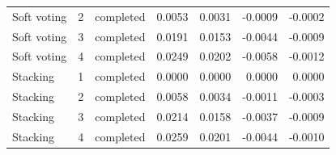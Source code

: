 \begin{table}[htbp]
\begin{tabular}{lrrrrrr}
Soft voting & 2 & completed & 0.0053 & 0.0031 & -0.0009 & -0.0002 \\
Soft voting & 3 & completed & 0.0191 & 0.0153 & -0.0044 & -0.0009 \\
Soft voting & 4 & completed & 0.0249 & 0.0202 & -0.0058 & -0.0012 \\
Stacking & 1 & completed & 0.0000 & 0.0000 & 0.0000 & 0.0000 \\
Stacking & 2 & completed & 0.0058 & 0.0034 & -0.0011 & -0.0003 \\
Stacking & 3 & completed & 0.0214 & 0.0158 & -0.0037 & -0.0009 \\
Stacking & 4 & completed & 0.0259 & 0.0201 & -0.0044 & -0.0010 \\
\bottomrule
\end{tabular}
\end{table}
